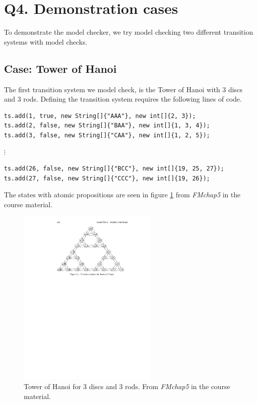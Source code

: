 \section{Q4. Demonstration cases}

To demonstrate the model checker, we try model checking two different transition systems with model checks.\\

\subsection{Case: Tower of Hanoi}
The first transition system we model check, is the Tower of Hanoi with 3 discs and 3 rods. Defining the transition system requires the following lines of code.
\begin{lstlisting}
ts.add(1, true, new String[]{"AAA"}, new int[]{2, 3});
ts.add(2, false, new String[]{"BAA"}, new int[]{1, 3, 4});
ts.add(3, false, new String[]{"CAA"}, new int[]{1, 2, 5});
\end{lstlisting}
\vspace{-2mm}
\hspace{0.4\linewidth} \textbf{$\vdots$ }
\vspace{-2mm}
\begin{lstlisting}
ts.add(26, false, new String[]{"BCC"}, new int[]{19, 25, 27});
ts.add(27, false, new String[]{"CCC"}, new int[]{19, 26});
\end{lstlisting}

The states with atomic propositions are seen in figure \ref{fig:toh} from \textit{FMchap5} in the course material.

\begin{figure}[H]
    \centering
    \includegraphics[width=0.6\textwidth]{fig/TowerOfHanoi.pdf}
    \caption{Tower of Hanoi for 3 discs and 3 rods. From \textit{FMchap5} in the course material. }
    \label{fig:toh}
\end{figure}

